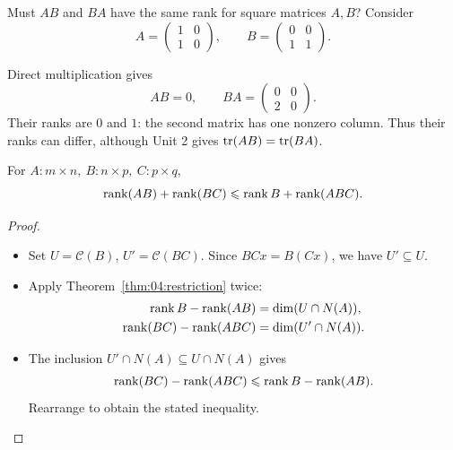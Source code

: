 \begin{example}\label{example:04:ab-ba}
Must \(AB\) and \(BA\) have the same rank for square matrices \(A,B\)?
Consider
\[
A=\begin{pmatrix}1&0\\1&0\end{pmatrix},
\qquad B=\begin{pmatrix}0&0\\1&1\end{pmatrix}.
\]
\par\smallskip
{}
Direct multiplication gives
\[
AB=0,\qquad BA=\begin{pmatrix}0&0\\2&0\end{pmatrix}.
\]
Their ranks are \(0\) and \(1\): the second matrix has one nonzero column.
Thus their ranks can differ, although Unit 2 gives
\(\operatorname{tr}(AB)=\operatorname{tr}(BA)\).
\end{example}

\begin{proposition}\label{prop:04:frobenius}
For \(A:m\times n,\ B:n\times p,\ C:p\times q\),
\[
\operatorname{rank}(AB)+\operatorname{rank}(BC)\leqslant\operatorname{rank} B+\operatorname{rank}(ABC).
\]
\end{proposition}
\begin{proof}
\begin{itemize}
\item Set \(U=\mathcal C(B)\), \(U'=\mathcal C(BC)\).
Since \(BCx=B(Cx)\), we have \(U'\subseteq U\).
\item Apply Theorem~\ref{thm:04:restriction} twice:
\[
\begin{aligned}
\operatorname{rank} B-\operatorname{rank}(AB)&=\dim(U\cap N(A)),\\
\operatorname{rank}(BC)-\operatorname{rank}(ABC)&=\dim(U'\cap N(A)).
\end{aligned}
\]
\item The inclusion \(U'\cap N(A)\subseteq U\cap N(A)\) gives
\[
\operatorname{rank}(BC)-\operatorname{rank}(ABC)\leqslant\operatorname{rank} B-\operatorname{rank}(AB).
\]
Rearrange to obtain the stated inequality.
\end{itemize}
\end{proof}

